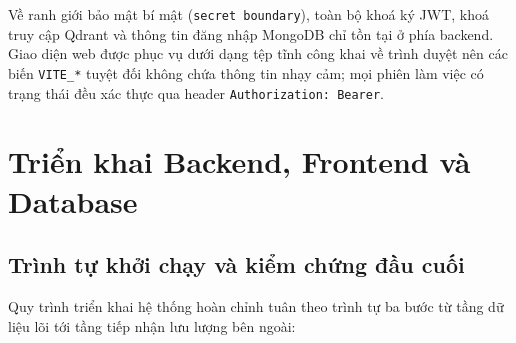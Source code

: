 Về ranh giới bảo mật bí mật (\texttt{secret boundary}), toàn bộ khoá ký JWT, khoá truy cập Qdrant và thông tin đăng nhập MongoDB chỉ tồn tại ở phía backend. Giao diện web được phục vụ dưới dạng tệp tĩnh công khai về trình duyệt nên các biến \texttt{VITE\_\allowbreak{}*} tuyệt đối không chứa thông tin nhạy cảm; mọi phiên làm việc có trạng thái đều xác thực qua header \texttt{Authorization:\allowbreak{} Bearer}.

\section{Triển khai Backend, Frontend và Database}
\label{sec:trien-khai-be-fe-db}

\subsection{Trình tự khởi chạy và kiểm chứng đầu cuối}
\label{subsec:trinh-tu-khoi-chay}

Quy trình triển khai hệ thống hoàn chỉnh tuân theo trình tự ba bước từ tầng dữ liệu lõi tới tầng tiếp nhận lưu lượng bên ngoài:

